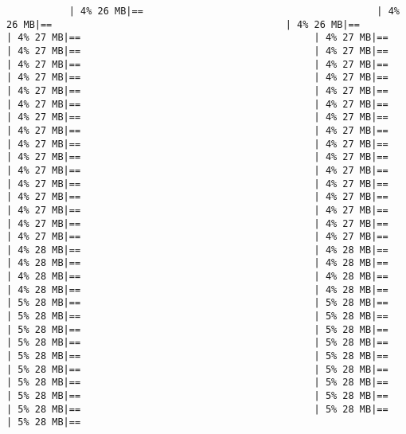 \documentclass[
]{article}
\begin{document}
\begin{verbatim}
           | 4% 26 MB|==                                         | 4% 26 MB|==                                         | 4% 26 MB|==                                         | 4% 27 MB|==                                         | 4% 27 MB|==                                         | 4% 27 MB|==                                         | 4% 27 MB|==                                         | 4% 27 MB|==                                         | 4% 27 MB|==                                         | 4% 27 MB|==                                         | 4% 27 MB|==                                         | 4% 27 MB|==                                         | 4% 27 MB|==                                         | 4% 27 MB|==                                         | 4% 27 MB|==                                         | 4% 27 MB|==                                         | 4% 27 MB|==                                         | 4% 27 MB|==                                         | 4% 27 MB|==                                         | 4% 27 MB|==                                         | 4% 27 MB|==                                         | 4% 27 MB|==                                         | 4% 27 MB|==                                         | 4% 27 MB|==                                         | 4% 27 MB|==                                         | 4% 27 MB|==                                         | 4% 27 MB|==                                         | 4% 27 MB|==                                         | 4% 27 MB|==                                         | 4% 27 MB|==                                         | 4% 27 MB|==                                         | 4% 27 MB|==                                         | 4% 27 MB|==                                         | 4% 27 MB|==                                         | 4% 27 MB|==                                         | 4% 28 MB|==                                         | 4% 28 MB|==                                         | 4% 28 MB|==                                         | 4% 28 MB|==                                         | 4% 28 MB|==                                         | 4% 28 MB|==                                         | 4% 28 MB|==                                         | 4% 28 MB|==                                         | 5% 28 MB|==                                         | 5% 28 MB|==                                         | 5% 28 MB|==                                         | 5% 28 MB|==                                         | 5% 28 MB|==                                         | 5% 28 MB|==                                         | 5% 28 MB|==                                         | 5% 28 MB|==                                         | 5% 28 MB|==                                         | 5% 28 MB|==                                         | 5% 28 MB|==                                         | 5% 28 MB|==                                         | 5% 28 MB|==                                         | 5% 28 MB|==                                         | 5% 28 MB|==                                         | 5% 28 MB|==                                         | 5% 28 MB|==                                         | 5% 28 MB|==                                         | 5% 28 MB|== 
\end{verbatim}
\end{document}
